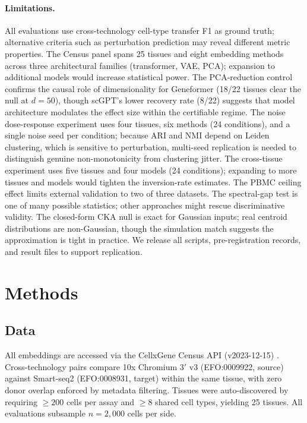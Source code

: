 \documentclass[11pt]{article}
\begin{document}
\paragraph{Limitations.} All evaluations use cross-technology cell-type
transfer F1 as ground truth; alternative criteria such as perturbation
prediction may reveal different metric properties. The Census panel
spans 25 tissues and eight embedding methods across three architectural
families (transformer, VAE, PCA); expansion to additional models would
increase statistical power. The PCA-reduction control confirms the causal role of dimensionality
for Geneformer (18/22 tissues clear the null at $d = 50$), though
scGPT's lower recovery rate (8/22) suggests that model architecture
modulates the effect size within the certifiable regime. The noise
dose-response experiment
uses four tissues, six methods (24 conditions), and a single noise seed
per condition; because ARI and NMI depend on Leiden clustering, which is
sensitive to perturbation, multi-seed replication is needed to
distinguish genuine non-monotonicity from clustering jitter. The
cross-tissue experiment uses five tissues and four models (24
conditions); expanding to more tissues and models would tighten the
inversion-rate estimates. The PBMC ceiling effect limits
external validation to two of three datasets. The spectral-gap test is
one of many possible statistics; other approaches might rescue
discriminative validity. The closed-form CKA null is exact for Gaussian
inputs; real centroid distributions are non-Gaussian, though the
simulation match suggests the approximation is tight in practice. We
release all scripts, pre-registration records, and result files to
support replication.


\section{Methods}

\subsection{Data}

All embeddings are accessed via the CellxGene Census API (v2023-12-15)
\citep{abdulla2025cellxgene}. Cross-technology pairs compare 10x
Chromium 3$'$ v3 (EFO:0009922, source) against Smart-seq2
(EFO:0008931, target) within the same tissue, with zero donor overlap
enforced by metadata filtering. Tissues were auto-discovered by
requiring $\geq 200$ cells per assay and $\geq 8$ shared cell types,
yielding 25 tissues. All evaluations subsample $n = 2{,}000$ cells per
side.
\end{document}

